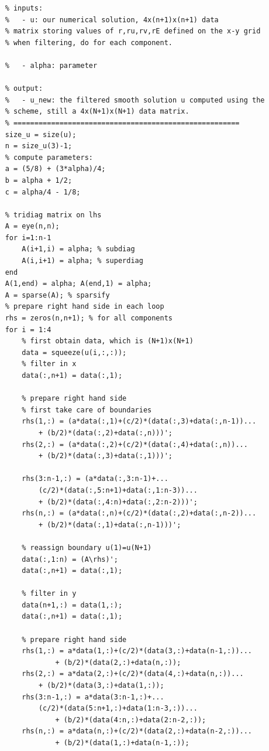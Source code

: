 \documentclass[12pt]{article}
\begin{document}
\begin{verbatim}
    % inputs:
    %   - u: our numerical solution, 4x(n+1)x(n+1) data
    % matrix storing values of r,ru,rv,rE defined on the x-y grid
    % when filtering, do for each component.

    %   - alpha: parameter

    % output:
    %   - u_new: the filtered smooth solution u computed using the
    % scheme, still a 4x(N+1)x(N+1) data matrix.
    % ======================================================
    size_u = size(u);
    n = size_u(3)-1;
    % compute parameters:
    a = (5/8) + (3*alpha)/4;
    b = alpha + 1/2;
    c = alpha/4 - 1/8;

    % tridiag matrix on lhs
    A = eye(n,n);
    for i=1:n-1
        A(i+1,i) = alpha; % subdiag
        A(i,i+1) = alpha; % superdiag
    end
    A(1,end) = alpha; A(end,1) = alpha;
    A = sparse(A); % sparsify
    % prepare right hand side in each loop
    rhs = zeros(n,n+1); % for all components
    for i = 1:4
        % first obtain data, which is (N+1)x(N+1)
        data = squeeze(u(i,:,:));
        % filter in x
        data(:,n+1) = data(:,1);

        % prepare right hand side
        % first take care of boundaries
        rhs(1,:) = (a*data(:,1)+(c/2)*(data(:,3)+data(:,n-1))...
            + (b/2)*(data(:,2)+data(:,n)))';
        rhs(2,:) = (a*data(:,2)+(c/2)*(data(:,4)+data(:,n))...
            + (b/2)*(data(:,3)+data(:,1)))';

        rhs(3:n-1,:) = (a*data(:,3:n-1)+...
            (c/2)*(data(:,5:n+1)+data(:,1:n-3))...
            + (b/2)*(data(:,4:n)+data(:,2:n-2)))';
        rhs(n,:) = (a*data(:,n)+(c/2)*(data(:,2)+data(:,n-2))...
            + (b/2)*(data(:,1)+data(:,n-1)))';

        % reassign boundary u(1)=u(N+1)
        data(:,1:n) = (A\rhs)';
        data(:,n+1) = data(:,1);

        % filter in y
        data(n+1,:) = data(1,:);
        data(:,n+1) = data(:,1);

        % prepare right hand side
        rhs(1,:) = a*data(1,:)+(c/2)*(data(3,:)+data(n-1,:))...
                + (b/2)*(data(2,:)+data(n,:));
        rhs(2,:) = a*data(2,:)+(c/2)*(data(4,:)+data(n,:))...
            + (b/2)*(data(3,:)+data(1,:));
        rhs(3:n-1,:) = a*data(3:n-1,:)+...
            (c/2)*(data(5:n+1,:)+data(1:n-3,:))...
                + (b/2)*(data(4:n,:)+data(2:n-2,:));
        rhs(n,:) = a*data(n,:)+(c/2)*(data(2,:)+data(n-2,:))...
                + (b/2)*(data(1,:)+data(n-1,:));


\end{verbatim}
\end{document}
